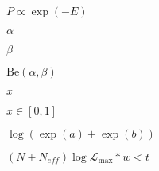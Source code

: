 \documentclass{article}
\begin{document}
$ P \propto \exp(-E)$
\pagebreak

$\alpha$
\pagebreak

$\beta$
\pagebreak

$ \mathrm{Be}(\alpha, \beta)$
\pagebreak

$x$
\pagebreak

$x \in [0, 1] $
\pagebreak

$ \log( \exp(a) + \exp(b) ) $
\pagebreak

$(N + N_{eff}) \log \mathcal{L}_{\max} * w < t $
\pagebreak
\end{document}
